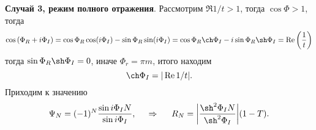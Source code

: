 \textbf{ Случай 3, режим полного отражения}. Рассмотрим $\Re 1/t > 1$, тогда $\cos \Phi > 1$, тогда
\begin{equation*}
    \cos \left(\Phi_R + i \Phi_I\right) = \cos \Phi_R \cos (i \Phi_I) - \sin \Phi_R \sin (i \Phi_I) = 
    \cos \Phi_R \ch \Phi_I - i \sin \Phi_R \sh \Phi_I = \Re \left(\frac{1}{t}\right)
\end{equation*}
тогда $\sin \Phi_R \sh \Phi_I = 0$, иначе $\Phi_r = \pi m$, итого находим
\begin{equation*}
    \ch \Phi_I = |\Re 1/t|.
\end{equation*}
Приходим к значению
\begin{equation*}
    \Psi_N = (-1)^N \frac{\sin i \Phi_I N}{\sin i \Phi_I},
    \hspace{0.5cm} \Rightarrow \hspace{0.5cm}
    R_N = \bigg|
        \frac{\sh^2 \Phi_I N}{\sh^2 \Phi_I}
    \bigg| (1-T).
\end{equation*}
